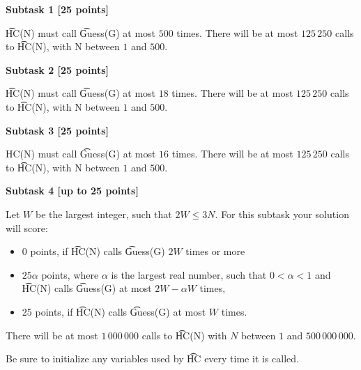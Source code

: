 {\bf Subtask 1 [25 points]}

\t{HC(N)} must call \t{Guess(G)} at most $500$ times. There will be at most $125\,250$ calls to \t{HC(N)}, with N between $1$ and $500$.

{\bf Subtask 2 [25 points]}

\t{HC(N)} must call \t{Guess(G)} at most $18$ times. There will be at most $125\,250$ calls to \t{HC(N)}, with N between $1$ and $500$.

{\bf Subtask 3 [25 points]}

HC(N) must call \t{Guess(G)} at most $16$ times. There will be at most $125\,250$ calls to \t{HC(N)}, with N between $1$ and $500$.

{\bf Subtask 4 [up to 25 points]}

Let $W$ be the largest integer, such that $2 W \le 3 N$. For this subtask your solution will score:
\begin{itemize}
\item $0$ points, if \t{HC(N)} calls \t{Guess(G)} $2W$ times or more
\item $25\alpha$ points, where $\alpha$ is the largest real number, such that $0 < \alpha < 1$
and \t{HC(N)} calls \t{Guess(G)} at most $2W-\alpha W$ times,
\item 25 points, if \t{HC(N)} calls \t{Guess(G)} at most $W$ times.
\end{itemize}

There will be at most $1\,000\,000$ calls to \t{HC(N)} with $N$ between $1$ and $500\,000\,000$.

Be sure to initialize any variables used by \t{HC} every time it is called.